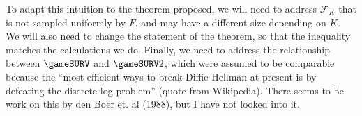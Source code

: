 To adapt this intuition to the theorem proposed, we will need to address $\mathcal{F}_K$ that is not sampled uniformly by $F$, and may have a different size depending on $K$. We will also need to change the statement of the theorem, so that the inequality matches the calculations we do. Finally, we need to address the relationship between $\gameSURV$ and $\gameSURV2$, which were assumed to be comparable because the ``most efficient ways to break Diffie Hellman at present is by defeating the discrete log problem'' (quote from Wikipedia). There seems to be work on this by den Boer et. al (1988), but I have not looked into it.

